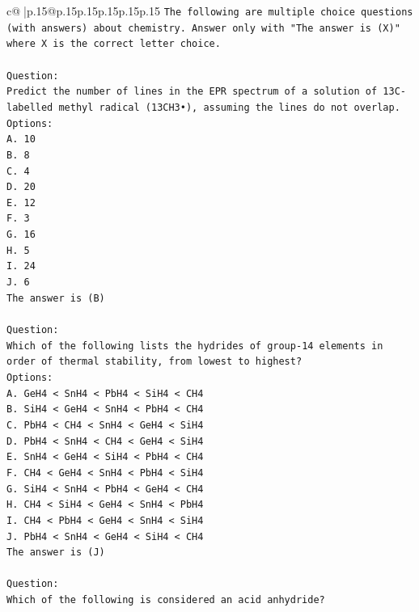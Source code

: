 \documentclass{article}
\begin{document}
{\begin{supertabular}{c@{$\;$}|p{.15\linewidth}@{}p{.15\linewidth}p{.15\linewidth}p{.15\linewidth}p{.15\linewidth}p{.15\linewidth}}
{{{\texttt{The following are multiple choice questions (with answers) about chemistry. Answer only with "The answer is (X)" where X is the correct letter choice.} \\
\\ 
\texttt{Question:} \\
\texttt{Predict the number of lines in the EPR spectrum of a solution of 13C{-}labelled methyl radical (13CH3•), assuming the lines do not overlap.} \\
\texttt{Options:} \\
\texttt{A. 10} \\
\texttt{B. 8} \\
\texttt{C. 4} \\
\texttt{D. 20} \\
\texttt{E. 12} \\
\texttt{F. 3} \\
\texttt{G. 16} \\
\texttt{H. 5} \\
\texttt{I. 24} \\
\texttt{J. 6} \\
\texttt{The answer is (B)} \\
\\ 
\texttt{Question:} \\
\texttt{Which of the following lists the hydrides of group{-}14 elements in order of thermal stability, from lowest to highest?} \\
\texttt{Options:} \\
\texttt{A. GeH4 < SnH4 < PbH4 < SiH4 < CH4} \\
\texttt{B. SiH4 < GeH4 < SnH4 < PbH4 < CH4} \\
\texttt{C. PbH4 < CH4 < SnH4 < GeH4 < SiH4} \\
\texttt{D. PbH4 < SnH4 < CH4 < GeH4 < SiH4} \\
\texttt{E. SnH4 < GeH4 < SiH4 < PbH4 < CH4} \\
\texttt{F. CH4 < GeH4 < SnH4 < PbH4 < SiH4} \\
\texttt{G. SiH4 < SnH4 < PbH4 < GeH4 < CH4} \\
\texttt{H. CH4 < SiH4 < GeH4 < SnH4 < PbH4} \\
\texttt{I. CH4 < PbH4 < GeH4 < SnH4 < SiH4} \\
\texttt{J. PbH4 < SnH4 < GeH4 < SiH4 < CH4} \\
\texttt{The answer is (J)} \\
\\ 
\texttt{Question:} \\
\texttt{Which of the following is considered an acid anhydride?} \\
}}}
\end{supertabular}}
\end{document}
